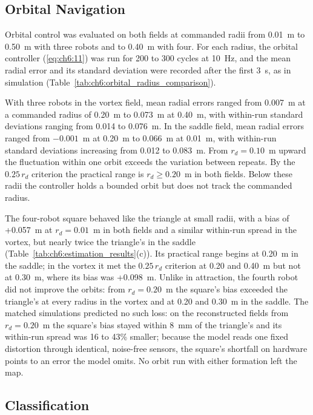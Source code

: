 \subsection{Orbital Navigation}
\label{sec:ch6:hw_orbit}

Orbital control was evaluated on both fields at commanded radii from 0.01~m to 0.50~m with three robots and to 0.40~m with four. For each radius, the orbital controller (\ref{eq:ch6:11}) was run for 200 to 300 cycles at 10~Hz, and the mean radial error and its standard deviation were recorded after the first 3~s, as in simulation (Table~\ref{tab:ch6:orbital_radius_comparison}).

 With three robots in the vortex field, mean radial errors ranged from 0.007~m at a commanded radius of 0.20~m to 0.073~m at 0.40~m, with within-run standard deviations ranging from 0.014 to 0.076~m. In the saddle field, mean radial errors ranged from $-0.001$~m at 0.20~m to 0.066~m at 0.01~m, with within-run standard deviations increasing from 0.012 to 0.083~m. From $r_d = 0.10$~m upward the fluctuation within one orbit exceeds the variation between repeats. By the $0.25\,r_d$ criterion the practical range is $r_d \ge 0.20$~m in both fields. Below these radii the controller holds a bounded orbit but does not track the commanded radius.

The four-robot square behaved like the triangle at small radii, with a bias of +0.057~m at $r_d = 0.01$~m in both fields and a similar within-run spread in the vortex, but nearly twice the triangle's in the saddle (Table~\ref{tab:ch6:estimation_results}(c)). Its practical range begins at 0.20~m in the saddle; in the vortex it met the $0.25\,r_d$ criterion at 0.20 and 0.40~m but not at 0.30~m, where its bias was +0.098~m. Unlike in attraction, the fourth robot did not improve the orbits: from $r_d = 0.20$~m the square's bias exceeded the triangle's at every radius in the vortex and at 0.20 and 0.30~m in the saddle. The matched simulations predicted no such loss: on the reconstructed fields from $r_d = 0.20$~m the square's bias stayed within 8~mm of the triangle's and its within-run spread was 16 to 43\% smaller; because the model reads one fixed distortion through identical, noise-free sensors, the square's shortfall on hardware points to an error the model omits. No orbit run with either formation left the map.

\subsection{Classification}
\label{sec:ch6:hw_class}

